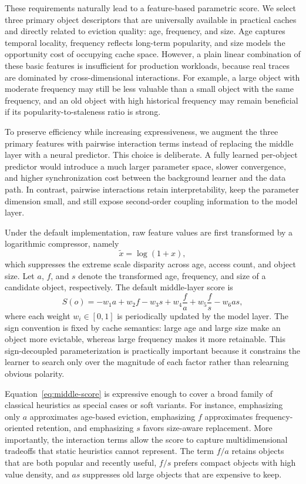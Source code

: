 \documentclass[10pt,journal]{IEEEtran}
\theoremstyle{slantedlemma}
\begin{document}
These requirements naturally lead to a feature-based parametric score. We select three primary object descriptors that are universally available in practical caches and directly related to eviction quality: age, frequency, and size. Age captures temporal locality, frequency reflects long-term popularity, and size models the opportunity cost of occupying cache space. However, a plain linear combination of these basic features is insufficient for production workloads, because real traces are dominated by cross-dimensional interactions. For example, a large object with moderate frequency may still be less valuable than a small object with the same frequency, and an old object with high historical frequency may remain beneficial if its popularity-to-staleness ratio is strong.

To preserve efficiency while increasing expressiveness, we augment the three primary features with pairwise interaction terms instead of replacing the middle layer with a neural predictor. This choice is deliberate. A fully learned per-object predictor would introduce a much larger parameter space, slower convergence, and higher synchronization cost between the background learner and the data path. In contrast, pairwise interactions retain interpretability, keep the parameter dimension small, and still expose second-order coupling information to the model layer.

Under the default implementation, raw feature values are first transformed by a logarithmic compressor, namely
\begin{equation}
\tilde{x}=\log(1+x),
\end{equation}
which suppresses the extreme scale disparity across age, access count, and object size. Let $a$, $f$, and $s$ denote the transformed age, frequency, and size of a candidate object, respectively. The default middle-layer score is
\begin{equation}
S(o) = -w_1 a + w_2 f - w_3 s + w_4 \frac{f}{a} + w_5 \frac{f}{s} - w_6 as,
\label{eq:middle-score}
\end{equation}
where each weight $w_i \in [0,1]$ is periodically updated by the model layer. The sign convention is fixed by cache semantics: large age and large size make an object more evictable, whereas large frequency makes it more retainable. This sign-decoupled parameterization is practically important because it constrains the learner to search only over the magnitude of each factor rather than relearning obvious polarity.

Equation~\ref{eq:middle-score} is expressive enough to cover a broad family of classical heuristics as special cases or soft variants. For instance, emphasizing only $a$ approximates age-based eviction, emphasizing $f$ approximates frequency-oriented retention, and emphasizing $s$ favors size-aware replacement. More importantly, the interaction terms allow the score to capture multidimensional tradeoffs that static heuristics cannot represent. The term $f/a$ retains objects that are both popular and recently useful, $f/s$ prefers compact objects with high value density, and $as$ suppresses old large objects that are expensive to keep.
\end{document}
